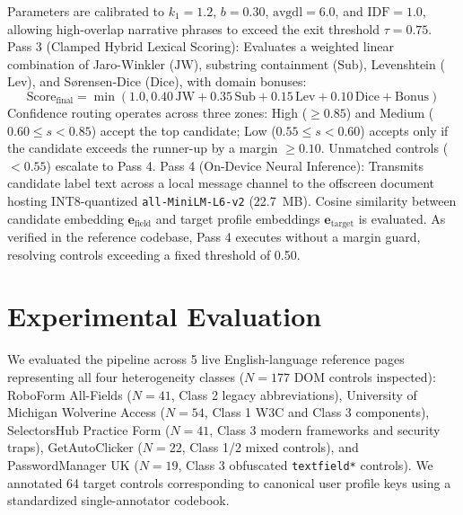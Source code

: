 \documentclass[11pt,runningheads,a4paper]{llncs}
\begin{document}
Parameters are calibrated to $k_1 = 1.2$, $b = 0.30$, $\text{avgdl} = 6.0$, and $\text{IDF} = 1.0$, allowing high-overlap narrative phrases to exceed the exit threshold $\tau = 0.75$.
Pass 3 (Clamped Hybrid Lexical Scoring): Evaluates a weighted linear combination of Jaro-Winkler ($\text{JW}$), substring containment ($\text{Sub}$), Levenshtein ($\text{Lev}$), and S{\o}rensen-Dice ($\text{Dice}$), with domain bonuses:
\begin{equation}
\text{Score}_{\text{final}} = \min\left(1.0, 0.40\,\text{JW} + 0.35\,\text{Sub} + 0.15\,\text{Lev} + 0.10\,\text{Dice} + \text{Bonus}\right)
\end{equation}
Confidence routing operates across three zones: High ($\ge 0.85$) and Medium ($0.60 \le s < 0.85$) accept the top candidate; Low ($0.55 \le s < 0.60$) accepts only if the candidate exceeds the runner-up by a margin $\ge 0.10$. Unmatched controls ($<0.55$) escalate to Pass 4.
Pass 4 (On-Device Neural Inference): Transmits candidate label text across a local message channel to the offscreen document hosting INT8-quantized \texttt{all-MiniLM-L6-v2} (22.7~MB). Cosine similarity between candidate embedding $\mathbf{e}_{\text{field}}$ and target profile embeddings $\mathbf{e}_{\text{target}}$ is evaluated. As verified in the reference codebase, Pass 4 executes without a margin guard, resolving controls exceeding a fixed threshold of 0.50.

\section{Experimental Evaluation}
We evaluated the pipeline across 5 live English-language reference pages representing all four heterogeneity classes ($N = 177$ DOM controls inspected): RoboForm All-Fields ($N = 41$, Class 2 legacy abbreviations), University of Michigan Wolverine Access ($N = 54$, Class 1 W3C and Class 3 components), SelectorsHub Practice Form ($N = 41$, Class 3 modern frameworks and security traps), GetAutoClicker ($N = 22$, Class 1/2 mixed controls), and PasswordManager UK ($N = 19$, Class 3 obfuscated \texttt{textfield*} controls). We annotated 64 target controls corresponding to canonical user profile keys using a standardized single-annotator codebook.
\end{document}
